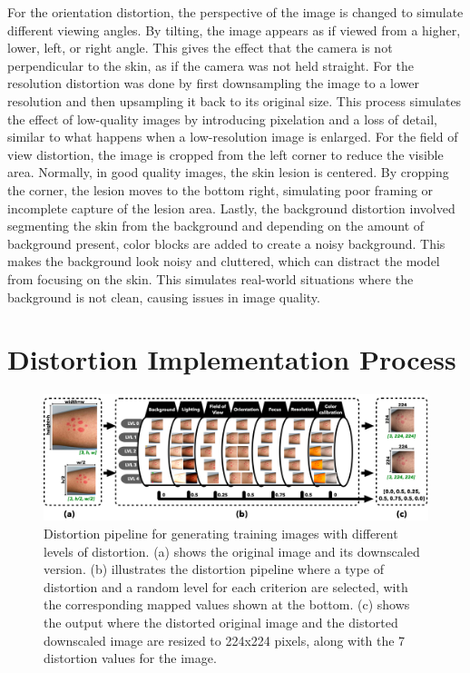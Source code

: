 For the orientation distortion, the perspective of the image is changed to simulate different viewing angles. By tilting, the image appears as if viewed from a higher, lower, left, or right angle. This gives the effect that the camera is not perpendicular to the skin, as if the camera was not held straight. For the resolution distortion was done by first downsampling the image to a lower resolution and then upsampling it back to its original size. This process simulates the effect of low-quality images by introducing pixelation and a loss of detail, similar to what happens when a low-resolution image is enlarged. For the field of view distortion, the image is cropped from the left corner to reduce the visible area. Normally, in good quality images, the skin lesion is centered. By cropping the corner, the lesion moves to the bottom right, simulating poor framing or incomplete capture of the lesion area. Lastly, the background distortion involved segmenting the skin from the background and depending on the amount of background present, color blocks are added to create a noisy background. This makes the background look noisy and cluttered, which can distract the model from focusing on the skin. This simulates real-world situations where the background is not clean, causing issues in image quality.\par

\section{Distortion Implementation Process}
\label{sec:DistProcess}

\begin{figure}[ht]
    \centering
    \includegraphics[keepaspectratio,width=15cm]{img/Distortion_pipeline.png}
    \caption{Distortion pipeline for generating training images with different levels of distortion. (a) shows the original image and its downscaled version. (b) illustrates the distortion pipeline where a type of distortion and a random level for each criterion are selected, with the corresponding mapped values shown at the bottom. (c) shows the output where the distorted original image and the distorted downscaled image are resized to 224x224 pixels, along with the 7 distortion values for the image.}
    \label{fig:DistPipeline}
\end{figure}

